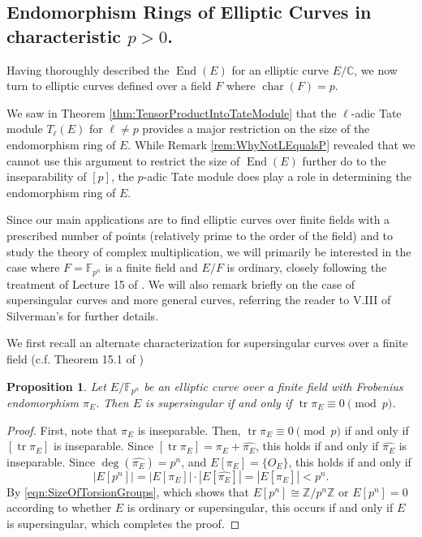\documentclass{amsart}
\newtheorem{prop}[thm]{Proposition}
\theoremstyle{definition}
\theoremstyle{remark}
\numberwithin{equation}{section}
\newcommand{\bbC}{\mathbb C}
\newcommand{\bbF}{\mathbb F}
\newcommand{\bbZ}{\mathbb Z}
\DeclareMathOperator{\Char}{char}
\DeclareMathOperator{\End}{End}
\DeclareMathOperator{\tr}{tr}
\begin{document}
\subsection{Endomorphism Rings of Elliptic Curves in characteristic $p > 0$.} \label{subsec:EndRingPrimeChar}

Having thoroughly described the $\End(E)$ for an elliptic curve $E/\bbC$, we now turn to elliptic curves defined over a field $F$ where $\Char(F) = p$.

We saw in Theorem \ref{thm:TensorProductIntoTateModule} that the $\ell$-adic Tate module $T_{\ell}(E)$ for $\ell \neq p$ provides a major restriction on the size of the endomorphism ring of $E$. While Remark \ref{rem:WhyNotLEqualsP} revealed that we cannot use this argument to restrict the size of $\End(E)$ further do to the inseparability of $[p]$, the $p$-adic Tate module does play a role in determining the endomorphism ring of $E$.

Since our main applications are to find elliptic curves over finite fields with a prescribed number of points (relatively prime to the order of the field) and to study the theory of complex multiplication, we will primarily be interested in the case where $F = \bbF_{p^n}$ is a finite field and $E/F$ is ordinary, closely following the treatment of Lecture 15 of \cite{SutherlandLN}.
 We will also remark briefly on the case of supersingular curves and more general curves, referring the reader to V.III of Silverman's \cite{SilvermanAEC} for further details.

We first recall an alternate characterization for supersingular curves over a finite field (c.f. Theorem 15.1 of \cite{SutherlandLN})


\begin{prop}
Let $E/\bbF_{p^n}$ be an elliptic curve over a finite field with Frobenius endomorphism $\pi_{E}$. Then $E$ is supersingular if and only if $\tr \pi_{E} \equiv 0 \pmod{p}$. 
\end{prop}

\begin{proof}
First, note that $\pi_{E}$ is inseparable. Then, $\tr \pi_{E} \equiv 0 \pmod{p}$ if and only if $[\tr \pi_{E}]$ is inseparable. Since $[\tr \pi_{E}] = \pi_{E} + \widehat{\pi_{E}}$, this holds if and only if  $\widehat{\pi_{E}}$ is inseparable. Since $\deg(\widehat{\pi_{E}}) = p^n$, and $E[\pi_{E}] = \{O_{E}\}$, this holds if and only if 
\[
 |E[p^n]| = |E[\pi_{E}]| \cdot |E[\widehat{\pi_{E}}]| =    |E[\widehat{\pi_{E}}]| < p^n.
\]
By \eqref{eqn:SizeOfTorsionGroups}, which shows that $E[p^n] \cong \bbZ/p^n \bbZ$ or $E[p^n] = 0$ according to whether $E$ is ordinary or supersingular, this occurs if and only if $E$ is supersingular, which completes the proof.
\end{proof}
\end{document}
